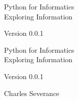 \documentclass[10pt]{book}
\newcommand{\theversion}{0.0.1}
\begin{document}
\frontmatter




\newtheorem{ex}{Exercise}[chapter]

\begin{latexonly}

\renewcommand{\blankpage}{\thispagestyle{empty} \quad \newpage}



\thispagestyle{empty}

\begin{flushright}
\vspace*{2.0in}

\begin{spacing}{3}
{\huge Python for Informatics}\\
{\Large Exploring Information}\\
\end{spacing}

\vspace{0.25in}

Version \theversion

\vfill

\end{flushright}


\blankpage
\blankpage

\pagebreak
\thispagestyle{empty}

\begin{flushright}
\vspace*{2.0in}

\begin{spacing}{3}
{\huge Python for Informatics}\\
{\Large Exploring Information}
\end{spacing}

\vspace{0.25in}

Version \theversion

\vspace{1in}


{\Large
Charles Severance\\
}



\end{flushright}
\end{latexonly}
\end{document}

